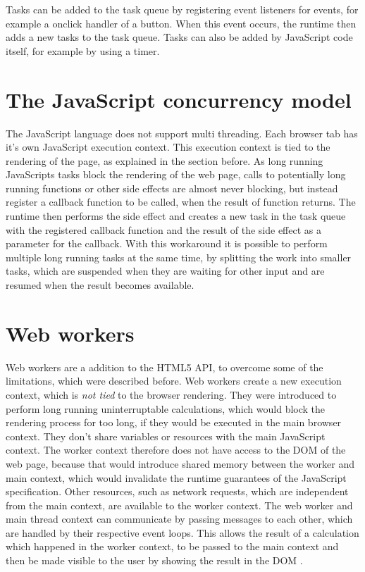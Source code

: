 \documentclass[
	ngerman,
	ruledheaders=section,%
	class=report,%
	thesis={type=bachelor},%
	accentcolor=9c,%
	custommargins=true,%
	marginpar=false,%
	parskip=half-,%
	fontsize=11pt,%
]{tudapub}
\begin{document}
  Tasks can be added to the task queue by registering event listeners for events, for example a onclick handler of a button. When this event occurs, the runtime then adds a new tasks to the task queue. Tasks can also be added by JavaScript code itself, for example by using a timer.

  
  \section{The JavaScript concurrency model}
  
  The JavaScript language does not support multi threading. Each browser tab has it's own JavaScript execution context. This execution context is tied to the rendering of the page, as explained in the section before. As long running JavaScripts tasks block the rendering of the web page, calls to potentially long running functions or other side effects are almost never blocking, but instead register a callback function to be called, when the result of function returns. The runtime then performs the side effect and creates a new task in the task queue with the registered callback function and the result of the side effect as a parameter for the callback. With this workaround it is possible to perform multiple long running tasks at the same time, by splitting the work into smaller tasks, which are suspended when they are waiting for other input and are resumed when the result becomes available.
  
  
  \section{Web workers}

  Web workers are a addition to the HTML5 API, to overcome some of the limitations, which were described before. Web workers create a new execution context, which is \textit{not tied} to the browser rendering. They were introduced to perform long running uninterruptable calculations, which would block the rendering process for too long, if they would be executed in the main browser context. They don't share variables or resources with the main JavaScript context. The worker context therefore does not have access to the DOM of the web page, because that would introduce shared memory between the worker and main context, which would invalidate the runtime guarantees of the JavaScript specification. Other resources, such as network requests, which are independent from the main context, are available to the worker context. The web worker and main thread context can communicate by passing messages to each other, which are handled by their respective event loops. This allows the result of a calculation which happened in the worker context, to be passed to the main context and then be made visible to the user by showing the result in the DOM
  .
\end{document}
